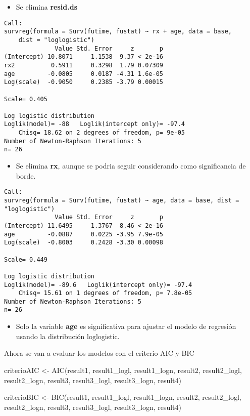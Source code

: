 \documentclass[
]{article}
\newenvironment{Shaded}{\begin{snugshade}}{\end{snugshade}}
\newcommand{\FunctionTok}[1]{\textcolor[rgb]{0.00,0.00,0.00}{#1}}
\newcommand{\NormalTok}[1]{#1}
\newcommand{\OtherTok}[1]{\textcolor[rgb]{0.56,0.35,0.01}{#1}}
\providecommand{\tightlist}{%
  \setlength{\itemsep}{0pt}\setlength{\parskip}{0pt}}
\begin{document}
\begin{itemize}
\tightlist
\item
  Se elimina \textbf{resid.ds}
\end{itemize}

\begin{verbatim}
Call:
survreg(formula = Surv(futime, fustat) ~ rx + age, data = base, 
    dist = "loglogistic")
              Value Std. Error     z       p
(Intercept) 10.8071     1.1538  9.37 < 2e-16
rx2          0.5911     0.3298  1.79 0.07309
age         -0.0805     0.0187 -4.31 1.6e-05
Log(scale)  -0.9050     0.2385 -3.79 0.00015

Scale= 0.405 

Log logistic distribution
Loglik(model)= -88   Loglik(intercept only)= -97.4
    Chisq= 18.62 on 2 degrees of freedom, p= 9e-05 
Number of Newton-Raphson Iterations: 5 
n= 26 
\end{verbatim}

\begin{itemize}
\tightlist
\item
  Se elimina \textbf{rx}, aunque se podria seguir considerando como
  significancia de borde.
\end{itemize}

\begin{verbatim}
Call:
survreg(formula = Surv(futime, fustat) ~ age, data = base, dist = "loglogistic")
              Value Std. Error     z       p
(Intercept) 11.6495     1.3767  8.46 < 2e-16
age         -0.0887     0.0225 -3.95 7.9e-05
Log(scale)  -0.8003     0.2428 -3.30 0.00098

Scale= 0.449 

Log logistic distribution
Loglik(model)= -89.6   Loglik(intercept only)= -97.4
    Chisq= 15.61 on 1 degrees of freedom, p= 7.8e-05 
Number of Newton-Raphson Iterations: 5 
n= 26 
\end{verbatim}

\begin{itemize}
\tightlist
\item
  Solo la variable \textbf{age} es significativa para ajustar el modelo
  de regresión usando la distribución loglogistic.
\end{itemize}

Ahora se van a evaluar los modelos con el criterio AIC y BIC

\begin{Shaded}
\begin{Highlighting}[]
\NormalTok{criterioAIC }\OtherTok{\textless{}{-}} \FunctionTok{AIC}\NormalTok{(result1, result1\_logl, result1\_logn, result2, result2\_logl, result2\_logn, result3, result3\_logl, result3\_logn, result4)}

\NormalTok{criterioBIC }\OtherTok{\textless{}{-}} \FunctionTok{BIC}\NormalTok{(result1, result1\_logl, result1\_logn, result2, result2\_logl, result2\_logn, result3, result3\_logl, result3\_logn, result4)}
\end{Highlighting}
\end{Shaded}
\end{document}
